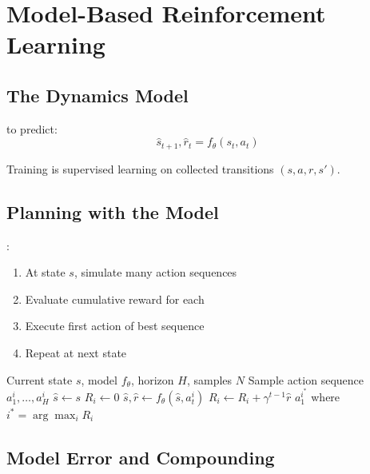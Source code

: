 \newpage
\section{Model-Based Reinforcement Learning}


\subsection{The Dynamics Model}

 to predict:
\begin{equation}
    \hat{s}_{t+1}, \hat{r}_t = f_\theta(s_t, a_t)
\end{equation}

Training is supervised learning on collected transitions $(s, a, r, s')$.

\subsection{Planning with the Model}

:
\begin{enumerate}
    \item At state $s$, simulate many action sequences
    \item Evaluate cumulative reward for each
    \item Execute first action of best sequence
    \item Repeat at next state
\end{enumerate}

\begin{algorithm}[H]
\caption{MPC with Learned Model}
\begin{algorithmic}[1]
\Require Current state $s$, model $f_\theta$, horizon $H$, samples $N$
    \State Sample action sequence $a_1^i, \ldots, a_H^i$
    \State $\hat{s} \gets s$
    \State $R_i \gets 0$
        \State $\hat{s}, \hat{r} \gets f_\theta(\hat{s}, a_t^i)$
        \State $R_i \gets R_i + \gamma^{t-1} \hat{r}$
    \EndFor
\EndFor
\State \Return $a_1^{i^*}$ where $i^* = \arg\max_i R_i$
\end{algorithmic}
\end{algorithm}

\subsection{Model Error and Compounding}

